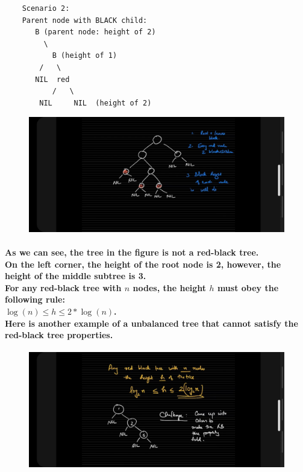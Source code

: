 \documentclass{article}
\begin{document}
\begin{verbatim}
    Scenario 2:
    Parent node with BLACK child:
       B (parent node: height of 2)
         \
           B (height of 1)
        /   \
       NIL  red
           /   \
        NIL     NIL  (height of 2)
\end{verbatim}    


\begin{figure}[H]
    \includegraphics[width=\textwidth]{notredblacktree.jpg}
\end{figure}

\paragraph{
    As we can see, the tree in the figure is not a red-black tree.\\
    On the left corner, the height of the root node is 2, however, the height of the middle subtree is 3.\\
    For any red-black tree with $n$ nodes, the height $h$ must obey the following rule: \\
    $\log(n) \leq h \leq 2*\log(n)$.\\
    Here is another example of a unbalanced tree that cannot satisfy the red-black tree properties.\\
}

\begin{figure}[H]
    \includegraphics[width=\textwidth]{notbalancedtree.jpg}
\end{figure}
\end{document}
